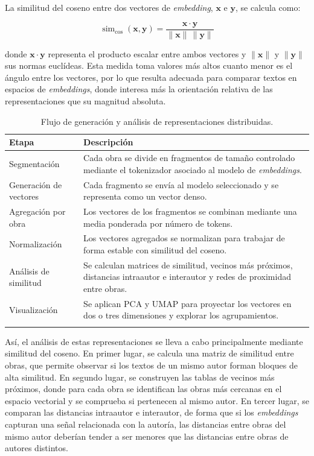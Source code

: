 \documentclass[IB]{TFUOC}%
\begin{document}
La similitud del coseno entre dos vectores de \textit{embedding}, $\mathbf{x}$ e $\mathbf{y}$, se calcula como:

\[
\operatorname{sim}_{\cos}(\mathbf{x}, \mathbf{y}) =
\frac{\mathbf{x} \cdot \mathbf{y}}{\|\mathbf{x}\| \, \|\mathbf{y}\|}
\]

donde $\mathbf{x} \cdot \mathbf{y}$ representa el producto escalar entre ambos vectores y $\|\mathbf{x}\|$ y $\|\mathbf{y}\|$ sus normas euclídeas. Esta medida toma valores más altos cuanto menor es el ángulo entre los vectores, por lo que resulta adecuada para comparar textos en espacios de \textit{embeddings}, donde interesa más la orientación relativa de las representaciones que su magnitud absoluta.

\begin{longtable}{|p{4.4cm}|p{11cm}|}
\hline
\textbf{Etapa} & \textbf{Descripción} \\
\hline

Segmentación &
Cada obra se divide en fragmentos de tamaño controlado mediante el tokenizador asociado al modelo de \textit{embeddings}. \\
\hline

Generación de vectores &
Cada fragmento se envía al modelo seleccionado y se representa como un vector denso. \\
\hline

Agregación por obra &
Los vectores de los fragmentos se combinan mediante una media ponderada por número de tokens. \\
\hline

Normalización &
Los vectores agregados se normalizan para trabajar de forma estable con similitud del coseno. \\
\hline

Análisis de similitud &
Se calculan matrices de similitud, vecinos más próximos, distancias intraautor e interautor y redes de proximidad entre obras. \\
\hline

Visualización &
Se aplican PCA y UMAP para proyectar los vectores en dos o tres dimensiones y explorar los agrupamientos. \\
\hline

\caption{Flujo de generación y análisis de representaciones distribuidas.}
\label{tab:representaciones-distribuidas}
\end{longtable}

Así, el análisis de estas representaciones se lleva a cabo principalmente mediante similitud del coseno. En primer lugar, se calcula una matriz de similitud entre obras, que permite observar si los textos de un mismo autor forman bloques de alta similitud. En segundo lugar, se construyen las tablas de vecinos más próximos, donde para cada obra se identifican las obras más cercanas en el espacio vectorial y se comprueba si pertenecen al mismo autor. En tercer lugar, se comparan las distancias intraautor e interautor, de forma que si los \textit{embeddings} capturan una señal relacionada con la autoría, las distancias entre obras del mismo autor deberían tender a ser menores que las distancias entre obras de autores distintos.
\end{document}
